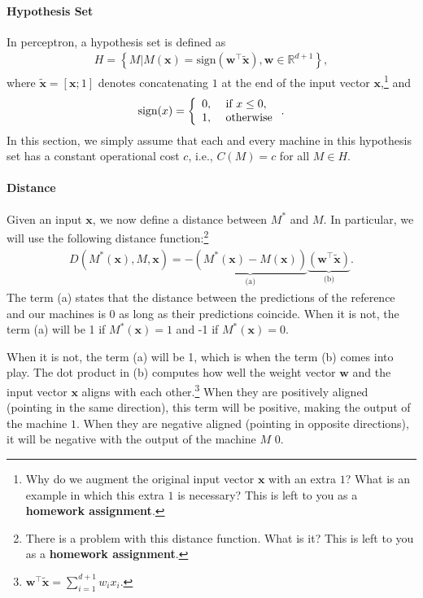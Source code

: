 \documentclass{report}
\newcommand{\vect}[1]{\mathbf{#1}}
\newcommand{\vx}[0]{\vect{x}}
\newcommand{\vw}[0]{\vect{w}}
\newcommand{\sign}{\text{sign}}
\begin{document}
\paragraph{Hypothesis Set}

In perceptron, a hypothesis set is defined as
\begin{align*}
    H = \left\{ 
    M | M(\vx) = \sign(\vw^\top \tilde{\vx}), \vw \in \mathbb{R}^{d+1}
    \right\},
\end{align*}
where $\tilde{\vx} = \left[ \vx; 1\right]$ denotes concatenating $1$ at the end
of the input vector $\vx$,\footnote{
    Why do we augment the original input vector $\vx$ with an extra $1$? What is
    an example in which this extra $1$ is necessary?  This is left to you as a
    {\bf homework assignment}.
}
and 
\begin{align}
    \label{eq:sign}
    \sign(x) = \left\{ \begin{array}{l l}
            0,&\text{ if } x \leq 0, \\
            1,&\text{ otherwise}
        \end{array}
        \right..
\end{align}
In this section, we simply assume that each and every machine in this hypothesis
set has a constant operational cost $c$, i.e., $C(M)=c$ for all $M\in H$. 

\paragraph{Distance}

Given an input $\vx$, we now define a distance between $M^*$ and $M$. In
particular, we will use the following distance function:\footnote{
    There is a problem with this distance function. What is it?  This is left to
    you as a {\bf homework assignment}.
}
\begin{align}
    \label{eq:perceptron_dist}
    D(M^*(\vx), M, \vx) = -\underbrace{\left( M^*(\vx) - M(\vx)
    \right)}_{\text{(a)}} \underbrace{\left(\vw^\top
    \tilde{\vx}\right)}_{\text{(b)}}.
\end{align}
The term (a) states that the distance between the predictions of the reference
and our machines is $0$ as long as their predictions coincide. When it is not,
the term (a) will be 1 if $M^*(\vx) = 1$ and -1 if $M^*(\vx) = 0$.

When it is not, the term (a) will be 1, which is when the term (b) comes into
play. The dot product in (b) computes how well the weight vector $\vw$ and the
input vector $\vx$ aligns with each other.\footnote{
    $\vw^\top \tilde{\vx} = \sum_{i=1}^{d+1} w_i x_i$.
} When they are positively aligned (pointing in the same direction), this term
will be positive, making the output of the machine $1$. When they are negative
aligned (pointing in opposite directions), it will be negative with the output
of the machine $M$ $0$.
\end{document}
